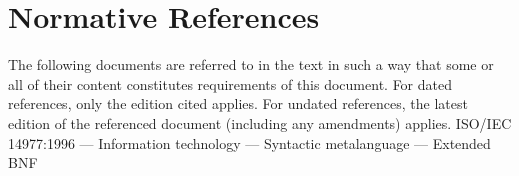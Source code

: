\chapter{Normative References}
\para The following documents are referred to in the text in such a way that some or all of their content constitutes
requirements of this document. For dated references, only the edition cited applies. For undated references,
the latest edition of the referenced document (including any amendments) applies.
\subpara ISO/IEC 14977:1996 --- Information technology — Syntactic metalanguage --- Extended BNF